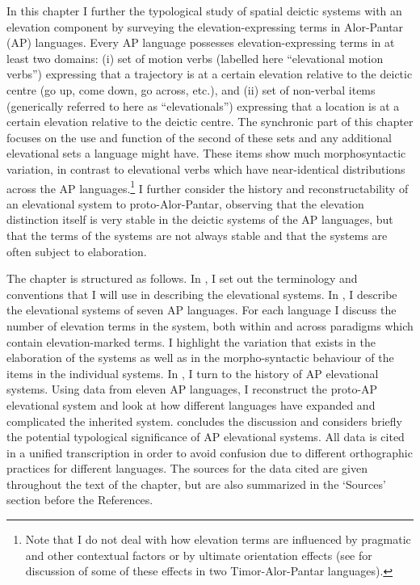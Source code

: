 In this chapter I further the typological study of spatial deictic systems with an elevation component by surveying the elevation-expressing terms in Alor-Pantar (AP) languages. Every AP language possesses elevation-expressing terms in at least two domains: (i) set of motion verbs (labelled here ``elevational motion verbs'') expressing that a trajectory is at a certain elevation relative to the deictic centre (go up, come down, go across, etc.), and (ii) set of non-verbal items (generically referred to here as ``elevationals'') expressing that a location is at a certain elevation relative to the deictic centre. The synchronic part of this chapter focuses on the use and function of the second of these sets and any additional elevational sets a language might have. These items show much morphosyntactic variation, in contrast to elevational verbs which have near-identical distributions across the AP languages.\footnote{Note that I do not deal with how elevation terms are influenced by pragmatic and other contextual factors or by ultimate orientation effects (see \citealt{Schapper2012} for discussion of some of these effects in two Timor-Alor-Pantar languages).} I further consider the history and reconstructability of an elevational system to proto-Alor-Pantar, observing that the elevation distinction itself is very stable in the deictic systems of the AP languages, but that the terms of the systems are not always stable and that the systems are often subject to elaboration. 

The chapter is structured as follows. In , I set out the terminology and conventions that I will use in describing the elevational systems. In , I describe the elevational systems of seven AP languages. For each language I discuss the number of elevation terms in the system, both within and across paradigms which contain elevation-marked terms. I highlight the variation that exists in the elaboration of the systems as well as in the morpho-syntactic behaviour of the items in the individual systems. In , I turn to the history of AP elevational systems. Using data from eleven AP languages, I reconstruct the proto-AP elevational system and look at how different languages have expanded and complicated the inherited system.  concludes the discussion and considers briefly the potential typological significance of AP elevational systems.
\enlargethispage{2em}
All data is cited in a unified transcription in order to avoid confusion due to different orthographic practices for different languages. The sources for the data cited are given throughout the text of the chapter, but are also summarized in the `Sources' section before the References. 

